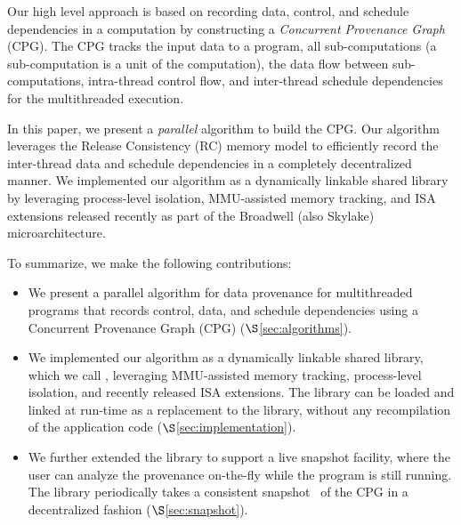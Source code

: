 Our high level approach is based on recording data, control, and schedule dependencies in a computation by constructing a {\em Concurrent Provenance Graph} (CPG). The CPG tracks the input data to a program, all sub-computations (a sub-computation is a unit of the computation), the data flow between sub-computations, intra-thread control flow, and inter-thread schedule dependencies for the multithreaded execution. 


In this paper, we present a {\em parallel} algorithm to build the CPG. Our algorithm leverages the Release Consistency (RC) memory model to efficiently record the inter-thread data and schedule dependencies in a completely decentralized manner. We implemented our algorithm as a dynamically linkable shared library by leveraging process-level isolation, MMU-assisted memory tracking, and \intelpt ISA extensions released recently as part of the Broadwell (also Skylake) microarchitecture. 



To summarize, we make the following contributions:
\begin{itemize}

\item We present a parallel algorithm for data provenance for multithreaded programs that records control, data, and schedule dependencies using a Concurrent Provenance Graph (CPG) ($\S$\ref{sec:algorithms}).

\item We implemented our algorithm as a dynamically linkable shared library, which we call \projecttitle, leveraging MMU-assisted memory tracking, process-level isolation, and recently released \intelpt ISA extensions.  The \projecttitle library can be loaded and linked at run-time as a replacement to the \pthreads library, without any recompilation  of the application code ($\S$\ref{sec:implementation}).

\item We further extended the library to support a live snapshot facility, where the user can analyze the provenance on-the-fly while the program is still running. The library periodically takes a consistent snapshot~\cite{chandy-lamport} of the CPG in a decentralized fashion ($\S$\ref{sec:snapshot}).



\end{itemize}



